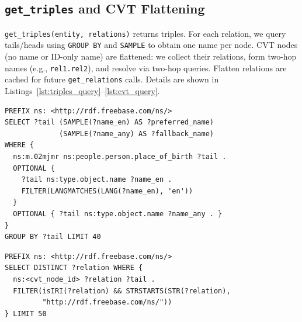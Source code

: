 \subsection{\texttt{get\_triples} and CVT Flattening}
\label{sec:get_triples}

\texttt{get\_triples(entity, relations)} returns triples. For each relation, we query tails/heads using \texttt{GROUP BY} and \texttt{SAMPLE} to obtain one name per node. CVT nodes (no name or ID-only name) are flattened: we collect their relations, form two-hop names (e.g., \texttt{rel1.rel2}), and resolve via two-hop queries. Flatten relations are cached for future \texttt{get\_relations} calls. 
Details are shown in Listings~\ref{lst:triples_query}--\ref{lst:cvt_query}.


\begin{lstlisting}[caption={Triples query with aggregation.},label=lst:triples_query,float=ht]
PREFIX ns: <http://rdf.freebase.com/ns/>
SELECT ?tail (SAMPLE(?name_en) AS ?preferred_name)
             (SAMPLE(?name_any) AS ?fallback_name)
WHERE {
  ns:m.02mjmr ns:people.person.place_of_birth ?tail .
  OPTIONAL { 
    ?tail ns:type.object.name ?name_en .
    FILTER(LANGMATCHES(LANG(?name_en), 'en'))
  }
  OPTIONAL { ?tail ns:type.object.name ?name_any . }
}
GROUP BY ?tail LIMIT 40
\end{lstlisting}

\begin{lstlisting}[caption={CVT relation query.},label=lst:cvt_query,float=ht]
PREFIX ns: <http://rdf.freebase.com/ns/>
SELECT DISTINCT ?relation WHERE {
  ns:<cvt_node_id> ?relation ?tail .
  FILTER(isIRI(?relation) && STRSTARTS(STR(?relation),
         "http://rdf.freebase.com/ns/"))
} LIMIT 50
\end{lstlisting}




